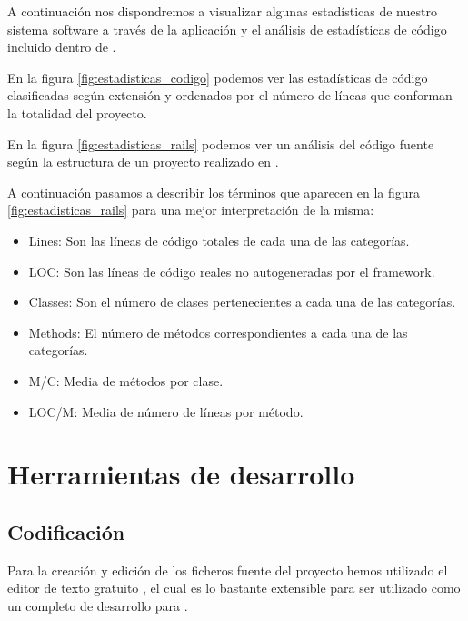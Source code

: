 A continuación nos dispondremos a visualizar algunas estadísticas de nuestro
sistema software a través de la aplicación 
\cite{prog:gitstats} y el análisis de estadísticas de código incluido dentro de
.

En la figura \ref{fig:estadisticas_codigo} podemos ver las estadísticas de
código clasificadas según extensión y ordenados por el número de líneas que
conforman la totalidad del proyecto.


En la figura \ref{fig:estadisticas_rails} podemos ver un análisis del código
fuente según la estructura de un proyecto realizado en .


A continuación pasamos a describir los términos que aparecen en la figura
\ref{fig:estadisticas_rails} para una mejor interpretación de la misma:

\begin{itemize}
\item Lines: Son las líneas de código totales de cada una de las categorías.
\item LOC: Son las líneas de código reales no autogeneradas por el framework.
\item Classes: Son el número de clases pertenecientes a cada una de las
  categorías.
\item Methods: El número de métodos correspondientes a cada una de las
  categorías.
\item M/C: Media de métodos por clase.
\item LOC/M: Media de número de líneas por método.
\end{itemize}

\section{Herramientas de desarrollo}
\subsection{Codificación}
Para la creación y edición de los ficheros fuente del proyecto hemos utilizado
el editor de texto gratuito  \cite{prog:sublimetext2}, el
cual es lo bastante extensible para ser utilizado como un completo 
de desarrollo para .

